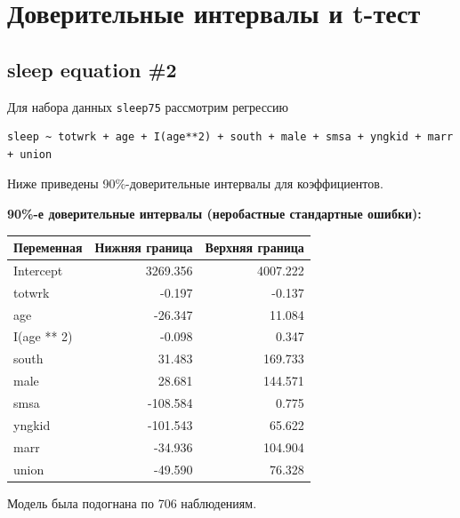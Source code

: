 \documentclass[
  russian,
]{article}
\newcounter{none} %
\begin{document}
\section{Доверительные интервалы и
t-тест}\label{ux434ux43eux432ux435ux440ux438ux442ux435ux43bux44cux43dux44bux435-ux438ux43dux442ux435ux440ux432ux430ux43bux44b-ux438-t-ux442ux435ux441ux442}

\subsection{sleep equation \#2}\label{sleep-equation-2}

Для набора данных \texttt{sleep75} рассмотрим регрессию

\begin{verbatim}
sleep ~ totwrk + age + I(age**2) + south + male + smsa + yngkid + marr + union
\end{verbatim}

Ниже приведены 90\%-доверительные интервалы для коэффициентов.

\textbf{90\%-е доверительные интервалы (неробастные стандартные
ошибки):}

{\def\LTcaptype{none} %
\begin{longtable}[]{@{}lrr@{}}
\toprule\noalign{}
Переменная & Нижняя граница & Верхняя граница \\
\midrule\noalign{}
\endhead
\bottomrule\noalign{}
\endlastfoot
Intercept & 3269.356 & 4007.222 \\
totwrk & -0.197 & -0.137 \\
age & -26.347 & 11.084 \\
I(age ** 2) & -0.098 & 0.347 \\
south & 31.483 & 169.733 \\
male & 28.681 & 144.571 \\
smsa & -108.584 & 0.775 \\
yngkid & -101.543 & 65.622 \\
marr & -34.936 & 104.904 \\
union & -49.590 & 76.328 \\
\end{longtable}
}

Модель была подогнана по 706 наблюдениям.
\end{document}
